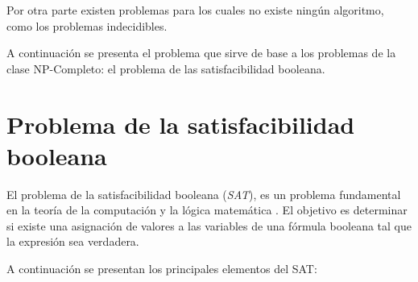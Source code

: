 Por otra parte existen problemas para los cuales no existe ningún algoritmo, como los problemas indecidibles.

A continuación se presenta el problema que sirve de base a los problemas de la clase NP-Completo: el problema de las satisfacibilidad
booleana.

\section{Problema de la satisfacibilidad booleana}

El problema de la satisfacibilidad booleana (\textit{SAT}), es un problema fundamental en la teoría de la 
computación y la lógica matemática \cite{authomataTheory}. El objetivo es determinar si existe una asignación 
de valores a las variables de una fórmula booleana tal que la expresión sea verdadera.

A continuación se presentan los principales elementos del SAT:

